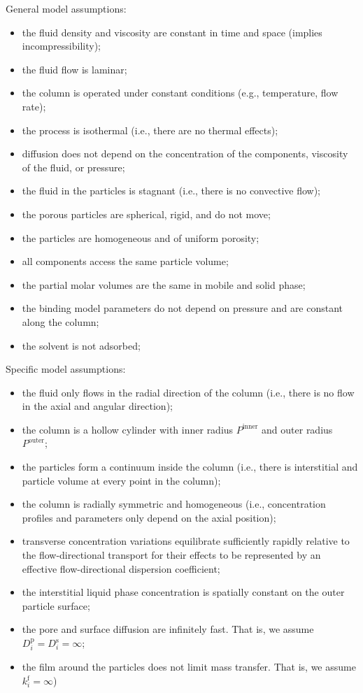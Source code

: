 \documentclass{article}
\begin{document}
General model assumptions:
\begin{itemize}
    \item the fluid density and viscosity are constant in time and space (implies incompressibility);
    \item the fluid flow is laminar;
    \item the column is operated under constant conditions (e.g., temperature, flow rate);
    \item the process is isothermal (i.e., there are no thermal effects);
    \item diffusion does not depend on the concentration of the components, viscosity of the fluid, or pressure;
    \item the fluid in the particles is stagnant (i.e., there is no convective flow);
    \item the porous particles are spherical, rigid, and do not move;
    \item the particles are homogeneous and of uniform porosity;
    \item all components access the same particle volume;
    \item the partial molar volumes are the same in mobile and solid phase;
    \item the binding model parameters do not depend on pressure and are constant along the column;
    \item the solvent is not adsorbed;
\end{itemize}

Specific model assumptions:
\begin{itemize}
    \item the fluid only flows in the radial direction of the column (i.e., there is no flow in the axial and angular direction);
    \item the column is a hollow cylinder with inner radius $P^{\mathrm{inner}}$ and outer radius $P^{\mathrm{outer}}$;
    \item the particles form a continuum inside the column (i.e., there is interstitial and particle volume at every point in the column);
    \item the column is radially symmetric and homogeneous (i.e., concentration profiles and parameters only depend on the axial position);
    \item transverse concentration variations equilibrate sufficiently rapidly relative to the flow-directional transport for their effects to be represented by an effective flow-directional dispersion coefficient;
    \item the interstitial liquid phase concentration is spatially constant on the outer particle surface;
    \item the pore and surface diffusion are infinitely fast. That is, we assume $D^{\mathrm{p}}_{i} = D^{\mathrm{s}}_{i} = \infty$;
    \item the film around the particles does not limit mass transfer. That is, we assume $k^{\mathrm{f}}_{i} = \infty$)
\end{itemize}
\end{document}

